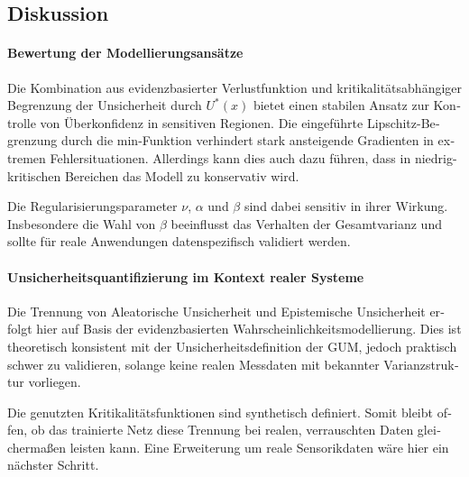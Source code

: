 \begin{otherlanguage}{ngerman}




\section{Diskussion}

\paragraph{Bewertung der Modellierungsansätze}

Die Kombination aus evidenzbasierter Verlustfunktion und kritikalitätsabhängiger Begrenzung der Unsicherheit durch $U^*(x)$ bietet einen stabilen Ansatz zur Kontrolle von Überkonfidenz in sensitiven Regionen. Die eingeführte Lipschitz-Begrenzung durch die min-Funktion verhindert stark ansteigende Gradienten in extremen Fehlersituationen.  Allerdings kann dies auch dazu führen, dass in niedrig-kritischen Bereichen das Modell zu konservativ wird.

Die Regularisierungsparameter $\nu$, $\alpha$ und $\beta$ sind dabei sensitiv in ihrer Wirkung. Insbesondere die Wahl von $\beta$ beeinflusst das Verhalten der Gesamtvarianz und sollte für reale Anwendungen datenspezifisch validiert werden.

\paragraph{Unsicherheitsquantifizierung im Kontext realer Systeme}

Die Trennung von \gls{Aleatorische Unsicherheit} und \gls{Epistemische Unsicherheit} erfolgt hier auf Basis der evidenzbasierten Wahrscheinlichkeitsmodellierung. Dies ist theoretisch konsistent mit der Unsicherheitsdefinition der GUM, jedoch praktisch schwer zu validieren, solange keine realen Messdaten mit bekannter Varianzstruktur vorliegen.

Die genutzten Kritikalitätsfunktionen sind synthetisch definiert. 
Somit bleibt offen, ob das trainierte Netz diese Trennung bei realen, verrauschten Daten gleichermaßen leisten kann. Eine Erweiterung um reale Sensorikdaten wäre hier ein nächster Schritt.


\end{otherlanguage}
